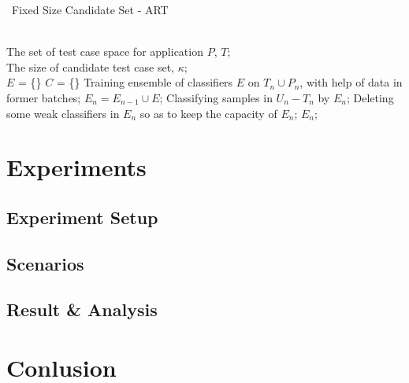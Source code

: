 \documentclass{sig-alternate}
\begin{document}
\renewcommand{\algorithmicrequire}{ \textbf{Input:}} %
\renewcommand{\algorithmicensure}{ \textbf{Output:}} %
\begin{algorithm}[htb] 
\caption{ ~Fixed Size Candidate Set - ART } 
\label{alg:Framwork} 
\begin{algorithmic}[1] %
\REQUIRE ~~\\ %
The set of test case space for application $P$, $T$;\\
The size of candidate test case set, $\kappa$;\bigskip\\
\STATE $E$ = \{\}
\STATE $C$ = \{\}
\label{ code:fram:extract }%
\STATE Training ensemble of classifiers $E$ on $T_n \cup P_n$, with help of data in former batches; 
\label{code:fram:trainbase}
\STATE $E_n=E_{n-1}\cup E$; 
\label{code:fram:add}
\STATE Classifying samples in $U_n-T_n$ by $E_n$; 
\label{code:fram:classify}
\STATE Deleting some weak classifiers in $E_n$ so as to keep the capacity of $E_n$; 
\label{code:fram:select}
\RETURN $E_n$; %
\end{algorithmic}
\end{algorithm}


\section{Experiments}
\subsection{Experiment Setup}
\subsection{Scenarios}
\subsection{Result \& Analysis}



\section{Conlusion}
\end{document}

